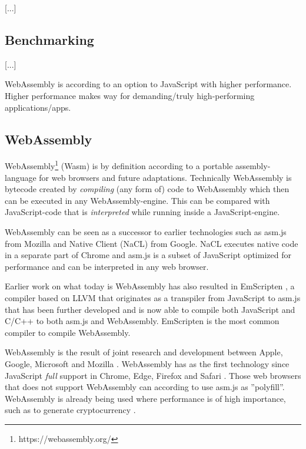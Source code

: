 [...]

\subsection{Benchmarking}

\parencite{LehmannPradel2018,MalleGiulianiKiesebergHolzinger2018}

[...]

WebAssembly is according to \textcite{HaasRossbergSchuffTitzerHolmanGohmanWagnerZakaiBastien2017} an option to JavaScript with higher performance. Higher performance makes way for demanding/truly high-performing applications/apps.

\subsection{WebAssembly}

WebAssembly\footnote{https://webassembly.org/} (Wasm) is by definition according to \textcite{HaasRossbergSchuffTitzerHolmanGohmanWagnerZakaiBastien2017} a portable assembly-language for web browsers and future adaptations. Technically WebAssembly is bytecode created by \emph{compiling} (any form of) code to WebAssembly \parencite{Watt2018} which then can be executed in any WebAssembly-engine. This can be compared with JavaScript-code that is \emph{interpreted} while running inside a JavaScript-engine.

WebAssembly can be seen as a successor to earlier technologies such as asm.js from Mozilla and Native Client (NaCL) from Google. NaCL executes native code in a separate part of Chrome and asm.js  \parencite{Zakai2018} is a subset of JavaScript optimized for performance \parencite{VanEsNicolayStievenartDHondtDeRoover2016} and can be interpreted in any web browser.

Earlier work on what today is WebAssembly has also resulted in EmScripten \parencite{Zakai2011}, a compiler based on LLVM \parencite{LattnerAdve2014} that originates as a transpiler from JavaScript to asm.js \parencite{Zakai2011} that has been further developed \parencite{HaasRossbergSchuffTitzerHolmanGohmanWagnerZakaiBastien2017} and is now able to compile both JavaScript and C/C++ to both asm.js and WebAssembly. EmScripten is the most common compiler to compile WebAssembly.

WebAssembly is the result of joint research and development between Apple, Google, Microsoft and Mozilla \parencite{HaasRossbergSchuffTitzerHolmanGohmanWagnerZakaiBastien2017}. WebAssembly has as the first technology since JavaScript \emph{full} support in Chrome, Edge, Firefox and Safari \parencite{Moller2018}. Those web browsers that does not support WebAssembly can according to \textcite{HaasRossbergSchuffTitzerHolmanGohmanWagnerZakaiBastien2017} use asm.js as ''polyfill''. WebAssembly is already being used where performance is of high importance, such as to generate cryptocurrency \parencite{RuthZimmermannWolsingHohlfeld2018}.

